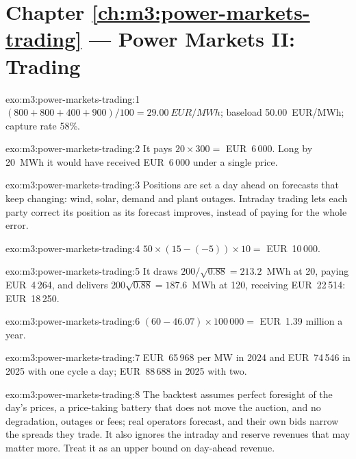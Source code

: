 \section*{Chapter \ref{ch:m3:power-markets-trading} --- Power Markets II: Trading}

\begin{solution}{exo:m3:power-markets-trading:1}
 $(800 + 800 + 400 + 900)/100 = \qty{29.00}{EUR/MWh}$; baseload
\qty{50.00}{EUR/MWh}; capture rate 58\%.
\end{solution}

\begin{solution}{exo:m3:power-markets-trading:2}
It pays $20 \times 300 = $ EUR~6\,000. Long by 20~MWh it would have received EUR~6\,000 under a
single price.
\end{solution}

\begin{solution}{exo:m3:power-markets-trading:3}
Positions are set a day ahead on forecasts that keep changing: wind, solar, demand and plant
outages. Intraday trading lets each party correct its position as its forecast improves,
instead of paying  for the whole error.
\end{solution}

\begin{solution}{exo:m3:power-markets-trading:4}
$50 \times (15 - (-5)) \times 10 = $ EUR~10\,000.
\end{solution}

\begin{solution}{exo:m3:power-markets-trading:5}
It draws $200/\sqrt{0.88} = 213.2$~MWh at \qty{20}{}, paying EUR~4\,264, and delivers
$200\sqrt{0.88} = 187.6$~MWh at \qty{120}{}, receiving EUR~22\,514: EUR~18\,250.
\end{solution}

\begin{solution}{exo:m3:power-markets-trading:6}
$(60 - 46.07) \times 100\,000 = $ EUR~1.39 million a year.
\end{solution}

\begin{solution}{exo:m3:power-markets-trading:7}
EUR~65\,968 per MW in 2024 and EUR~74\,546 in 2025 with one cycle a day; EUR~88\,688 in 2025
with two.
\end{solution}

\begin{solution}{exo:m3:power-markets-trading:8}
The backtest assumes perfect foresight of the day's prices, a price-taking battery that does
not move the auction, and no degradation, outages or fees; real operators forecast, and their
own bids narrow the spreads they trade. It also ignores the intraday and reserve revenues that
may matter more. Treat it as an upper bound on day-ahead revenue.
\end{solution}

